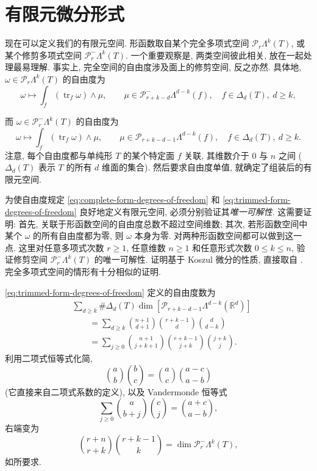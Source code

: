 \section{有限元微分形式}\label{sec:finite-element-differential-forms}

现在可以定义我们的有限元空间. 形函数取自某个完全多项式空间 $\mathcal P_r\Lambda^k(T)$, 或某个修剪多项式空间 $\mathcal P_r^-\Lambda^k(T)$. 一个重要观察是, 两类空间彼此相关, 放在一起处理最易理解. 事实上, 完全空间的自由度涉及面上的修剪空间, 反之亦然. 具体地, $\omega\in\mathcal P_r\Lambda^k(T)$ 的自由度为
\begin{equation}\label{eq:complete-form-degrees-of-freedom}
\omega\mapsto\int_f(\operatorname{tr}_f\omega)\wedge\mu,\qquad\mu\in\mathcal P_{r+k-d}^-\Lambda^{d-k}(f),\quad f\in\Delta_d(T),\ d\geq k,
\end{equation}

而 $\omega\in\mathcal P_r^-\Lambda^k(T)$ 的自由度为
\begin{equation}\label{eq:trimmed-form-degrees-of-freedom}
\omega\mapsto\int_f(\operatorname{tr}_f\omega)\wedge\mu,\qquad\mu\in\mathcal P_{r+k-d-1}\Lambda^{d-k}(f),\quad f\in\Delta_d(T),\ d\geq k.
\end{equation}
注意, 每个自由度都与单纯形 $T$ 的某个特定面 $f$ 关联, 其维数介于 $0$ 与 $n$ 之间 ($\Delta_d(T)$ 表示 $T$ 的所有 $d$ 维面的集合). 然后要求自由度单值, 就确定了组装后的有限元空间.

为使自由度规定 \eqref{eq:complete-form-degrees-of-freedom} 和 \eqref{eq:trimmed-form-degrees-of-freedom} 良好地定义有限元空间, 必须分别验证其\emph{唯一可解性}. 这需要证明: 首先, 关联于形函数空间的自由度总数不超过空间维数; 其次, 若形函数空间中某个 $\omega$ 的所有自由度都为零, 则 $\omega$ 本身为零. 对两种形函数空间都可以做到这一点. 这里对任意多项式次数 $r\geq1$, 任意维数 $n\geq1$ 和任意形式次数 $0\leq k\leq n$, 验证修剪空间 $\mathcal P_r^-\Lambda^k(T)$ 的唯一可解性. 证明基于 Koszul 微分的性质, 直接取自 . 完全多项式空间的情形有十分相似的证明.

\eqref{eq:trimmed-form-degrees-of-freedom} 定义的自由度数为
\[
\begin{aligned}
&\sum_{d\geq k}\#\Delta_d(T)\dim[\mathcal P_{r+k-d-1}\Lambda^{d-k}(\mathbb R^d)]\\
&\qquad=\sum_{d\geq k}\binom{n+1}{d+1}\binom{r+k-1}d\binom d{d-k}\\
&\qquad=\sum_{j\geq0}\binom{n+1}{j+k+1}\binom{r+k-1}{j+k}\binom{j+k}j.
\end{aligned}
\]
利用二项式恒等式化简,
\[
\binom ab\binom bc=\binom ac\binom{a-c}{a-b}
\]
(它直接来自二项式系数的定义), 以及 Vandermonde 恒等式
\[
\sum_{j\geq0}\binom a{b+j}\binom cj=\binom{a+c}{a-b},
\]
右端变为
\[
\binom{r+n}{r+k}\binom{r+k-1}k=\dim\mathcal P_r^-\Lambda^k(T),
\]
如所要求.

